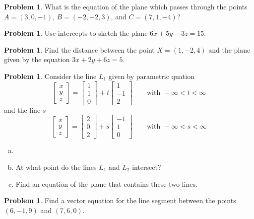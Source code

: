 \documentclass[10pt]{article}
\theoremstyle{definition}
\newtheorem{problem}[theorem]{Problem}
\newcommand{\1}[1]{\textbf{1}_{\left[#1\right]}} %
\begin{document}
\begin{problem}
  What is the equation of the plane which passes through the points $A=(3,0,-1)$, $B=(-2,-2,3)$, and
  $C=(7,1,-4)$?
\end{problem}

\begin{problem}
  Use intercepts to sketch the plane $6x+5y-3z=15$.
\end{problem}


\begin{problem}
  Find the distance between the point $X = (1,-2,4)$ and the plane given by the equation $3x+2y+6z=5$.
\end{problem}


\begin{problem}
  Consider the line $L_{1} $ given by parametric quation
  \begin{equation*}
    \begin{bmatrix}
      x\\y\\z
    \end{bmatrix}
    =
    \begin{bmatrix}
      1\\1\\0
    \end{bmatrix}
    +
    t
    \begin{bmatrix}
      1\\-1\\2
    \end{bmatrix}
    \quad \quad \text{with }-\infty<t<\infty
  \end{equation*}
  and the line $s$
  \begin{equation*}
    \begin{bmatrix}
      x\\y\\z
    \end{bmatrix}
    =
    \begin{bmatrix}
      2\\0\\2
    \end{bmatrix}
    +
    s
    \begin{bmatrix}
      -1\\1\\0
    \end{bmatrix}
    \quad \quad \text{with }-\infty<s<\infty
  \end{equation*}
  \begin{enumerate}[(a)]
    \item []
    \item At what point do the lines $L_{1}$ and $L_{2}$ intersect?
    \item Find an equation of the plane that contains these two lines.
  \end{enumerate}
\end{problem}
\begin{problem}
  Find a vector equation for the line segment between the points $(6,-1,9)$ and $(7,6,0)$.
\end{problem}
\end{document}
